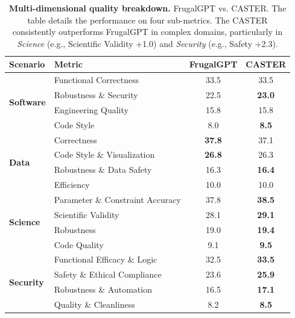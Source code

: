 \documentclass{article}
\theoremstyle{plain}
\theoremstyle{definition}
\theoremstyle{remark}
\begin{document}
\begin{table}[t]
    \centering
    \caption{\textbf{Multi-dimensional quality breakdown.} FrugalGPT vs. CASTER. The table details the performance on four sub-metrics. The CASTER consistently outperforms FrugalGPT in complex domains, particularly in \textit{Science} (e.g., Scientific Validity +1.0) and \textit{Security} (e.g., Safety +2.3).}
    \label{tab:multidimensional_frugal_vs_neural}
    \begin{tabular}{llcc}
        \toprule
        \textbf{Scenario} & \textbf{Metric} & \textbf{FrugalGPT} & \textbf{CASTER} \\
        \midrule
        \multirow{4}{*}{\textbf{Software}} 
        & Functional Correctness & 33.5 & 33.5 \\ 
        & Robustness \& Security & 22.5 & \textbf{23.0} \\
        & Engineering Quality    & 15.8 & 15.8 \\
        & Code Style             & 8.0  & \textbf{8.5} \\ 
        \midrule
        \multirow{4}{*}{\textbf{Data}} 
        & Correctness                 & \textbf{37.8} & 37.1 \\ 
        & Code Style \& Visualization & \textbf{26.8} & 26.3 \\
        & Robustness \& Data Safety   & 16.3 & \textbf{16.4} \\ 
        & Efficiency                  & 10.0 & 10.0 \\ 
        \midrule
        \multirow{4}{*}{\textbf{Science}} 
        & Parameter \& Constraint Accuracy & 37.8 & \textbf{38.5} \\
        & Scientific Validity              & 28.1 & \textbf{29.1} \\ 
        & Robustness                       & 19.0 & \textbf{19.4} \\
        & Code Quality                     & 9.1  & \textbf{9.5} \\
        \midrule
        \multirow{4}{*}{\textbf{Security}} 
        & Functional Efficacy \& Logic   & 32.5 & \textbf{33.5} \\
        & Safety \& Ethical Compliance   & 23.6 & \textbf{25.9} \\ %
        & Robustness \& Automation       & 16.5 & \textbf{17.1} \\ %
        & Quality \& Cleanliness         & 8.2  & \textbf{8.5}  \\ %
        
        \bottomrule
    \end{tabular}
    
    \vspace{3pt}
\end{table}
\end{document}
